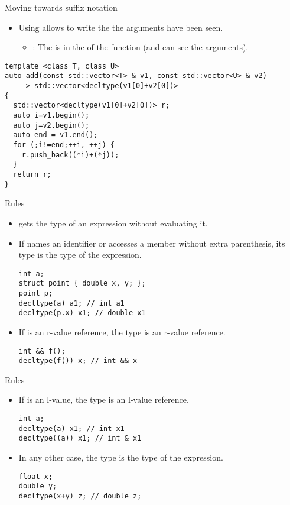 \begin{frame}[t,fragile]{Moving towards suffix notation}
  \begin{itemize}
    \item Using  allows to write the 
           the arguments have been seen.
      \begin{itemize}
        \item {}: 
              The  is in the 
              of the function (and can see the arguments).
      \end{itemize}
  \end{itemize}
\pause
\begin{lstlisting}
template <class T, class U>
auto add(const std::vector<T> & v1, const std::vector<U> & v2) 
    -> std::vector<decltype(v1[0]+v2[0])>
{
  std::vector<decltype(v1[0]+v2[0])> r;
  auto i=v1.begin();
  auto j=v2.begin();
  auto end = v1.end();
  for (;i!=end;++i, ++j) {
    r.push_back((*i)+(*j));
  }
  return r;
}
\end{lstlisting}
\end{frame}

\begin{frame}[t,fragile]{Rules}
  \begin{itemize}
    \item {} 
          gets the type of an expression without evaluating it.
    \item \pause If  names an identifier or accesses a member without extra parenthesis,
          its type is the type of the expression.
\begin{lstlisting}
int a;
struct point { double x, y; };
point p;
decltype(a) a1; // int a1
decltype(p.x) x1; // double x1
\end{lstlisting}
    \item \pause If  is an r-value reference, 
          the type is an r-value reference.
\begin{lstlisting}
int && f();
decltype(f()) x; // int && x
\end{lstlisting}
  \end{itemize}
\end{frame}

\begin{frame}[t,fragile]{Rules}
  \begin{itemize}
    \item If  is an l-value, the type is an l-value reference.
\begin{lstlisting}
int a;
decltype(a) x1; // int x1
decltype((a)) x1; // int & x1
\end{lstlisting}
    \item \pause In any other case, the type is the type of the expression.
\begin{lstlisting}
float x;
double y;
decltype(x+y) z; // double z;
\end{lstlisting}
  \end{itemize}
\end{frame}

